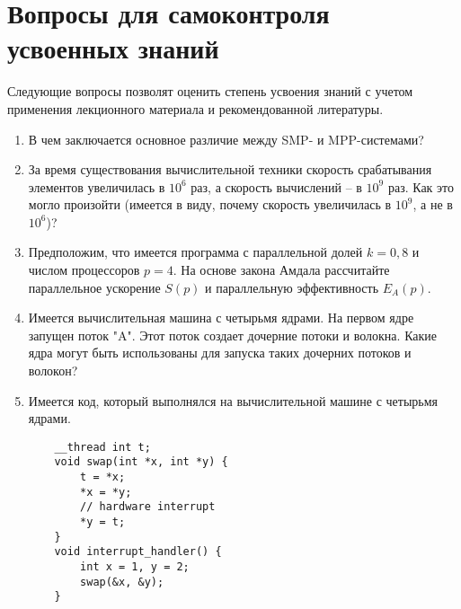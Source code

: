 \section{Вопросы для самоконтроля усвоенных знаний}

Следующие вопросы позволят оценить степень усвоения знаний с учетом применения лекционного материала и рекомендованной литературы.

\begin{enumerate}
    \item В чем заключается основное различие между SMP- и MPP-системами?
    \item За время существования вычислительной техники скорость срабатывания элементов увеличилась в $10^6$ раз, а скорость вычислений -- в $10^9$ раз. Как это могло произойти (имеется в виду, почему скорость увеличилась в $10^9$, а не в $10^6$)?
    \item Предположим, что имеется программа с параллельной долей $k = 0,8$ и числом процессоров $p = 4$. На основе закона Амдала рассчитайте параллельное ускорение $S(p)$ и параллельную эффективность $E_A(p)$.

    \item Имеется вычислительная машина с четырьмя ядрами. На первом ядре запущен поток "A". Этот поток создает дочерние потоки и волокна. Какие ядра могут быть использованы для запуска таких дочерних потоков и волокон?
    \item Имеется код, который выполнялся на вычислительной машине с четырьмя ядрами.
    \begin{verbatim}
    __thread int t;
    void swap(int *x, int *y) {
        t = *x;
        *x = *y;
        // hardware interrupt
        *y = t;
    }
    void interrupt_handler() {
        int x = 1, y = 2;
        swap(&x, &y);
    }
    \end{verbatim}


\end{enumerate}
